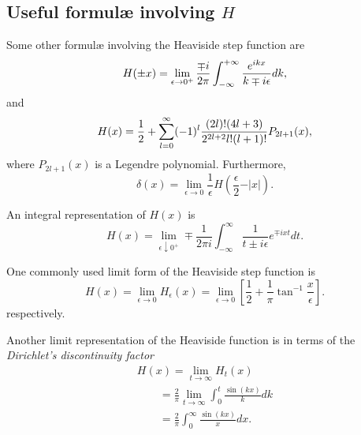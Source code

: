 \subsection{Useful formul\ae{} involving $H$}

Some other formul\ae{}  involving the Heaviside step function
are
 \begin{equation}
H (\pm x)=\lim_{\epsilon \rightarrow 0^+}{\mp i\over 2\pi
 }\int_{-\infty}^{+\infty} {e^{ikx}\over k\mp i\epsilon}dk,
 \end{equation}
and
 \begin{equation}
H (x)
={1\over 2}
+
\sum_{l=0}^\infty (-1)^l {(2l)!(4l+3)\over 2^{2l+2}l!(l+1)!}
P_{2l+1} (x),
 \end{equation}
where $P_{2l+1} (x)$ is a Legendre polynomial.
Furthermore,
\begin{equation}
\delta(x)=
\lim_{\epsilon \rightarrow 0}  \frac{1}{\epsilon } H\left( \frac{\epsilon }{2} -\vert x\vert\right) .
\end{equation}

An integral representation of $H(x)$ is
 \begin{equation}
H (x)
=\lim_{\epsilon \downarrow 0^+} \mp \frac{1}{2\pi i}
\int_{-\infty}^\infty
 \frac{1}{t \pm i\epsilon}e^{\mp ixt} dt.
 \end{equation}


One commonly used limit form  of the Heaviside step function is
\begin{equation}
H(x)= \lim_{\epsilon \rightarrow 0} H_\epsilon (x)=\lim_{\epsilon \rightarrow 0}   \left[ \frac{1 }{2} + \frac{1 }{\pi} \tan^{-1}  \frac{x}{\epsilon } \right] .
\end{equation}
respectively.

Another limit representation of the Heaviside function is in terms of the
{\em Dirichlet's discontinuity factor}
\begin{equation}
\begin{split}
H(x)= \lim_{t \rightarrow \infty} H_t (x)
\\ \qquad
= \frac{2}{\pi }\lim_{t \rightarrow \infty}\int_0^t \frac{\sin (kx)}{k} dk
\\
\qquad
=
 \frac{2}{\pi }\int_0^\infty \frac{\sin (kx)}{x} dx
.
\end{split}
\label{2012-m-ch-di-dcf}
\end{equation}


